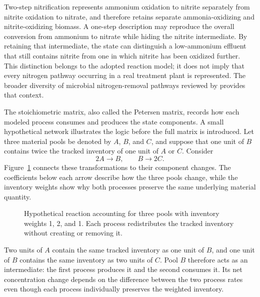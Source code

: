 Two-step nitrification represents ammonium oxidation to nitrite separately from nitrite oxidation to nitrate, and therefore retains separate ammonia-oxidizing and nitrite-oxidizing biomass. A one-step description may reproduce the overall conversion from ammonium to nitrate while hiding the nitrite intermediate. By retaining that intermediate, the state can distinguish a low-ammonium effluent that still contains nitrite from one in which nitrite has been oxidized further. This distinction belongs to the adopted reaction model; it does not imply that every nitrogen pathway occurring in a real treatment plant is represented. The broader diversity of microbial nitrogen-removal pathways reviewed by \citet{Duan2022} provides that context.

The stoichiometric matrix, also called the Petersen matrix, records how each modeled process consumes and produces the state components. A small hypothetical network illustrates the logic before the full matrix is introduced. Let three material pools be denoted by $A$, $B$, and $C$, and suppose that one unit of $B$ contains twice the tracked inventory of one unit of $A$ or $C$. Consider
\[
2A\longrightarrow B,\qquad B\longrightarrow2C.
\]
Figure~\ref{fig:reactor_reaction_accounting} connects these transformations to their component changes. The coefficients below each arrow describe how the three pools change, while the inventory weights show why both processes preserve the same underlying material quantity.

\begin{figure}[htbp]
\centering

\caption{Hypothetical reaction accounting for three pools with inventory weights 1, 2, and 1. Each process redistributes the tracked inventory without creating or removing it.}
\label{fig:reactor_reaction_accounting}
\end{figure}

Two units of $A$ contain the same tracked inventory as one unit of $B$, and one unit of $B$ contains the same inventory as two units of $C$. Pool $B$ therefore acts as an intermediate: the first process produces it and the second consumes it. Its net concentration change depends on the difference between the two process rates even though each process individually preserves the weighted inventory.

